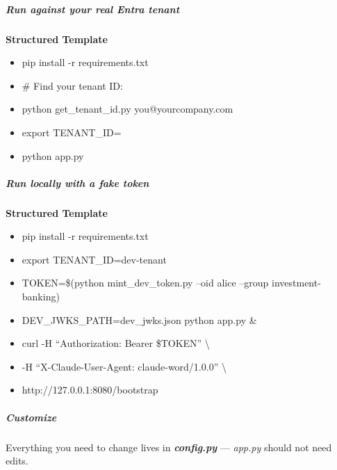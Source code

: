 \documentclass[11pt]{article}
\begin{document}
\subparagraph{Run against your real Entra tenant}\mbox{}\par

\textbf{Structured Template}
\begin{itemize}[leftmargin=*,itemsep=2pt,topsep=2pt]
\item {} pip install -r requirements.txt
\item {} \# Find your tenant ID:
\item {} python get\_\allowbreak{}tenant\_\allowbreak{}id.py you@yourcompany.com
\item {} export TENANT\_\allowbreak{}ID=
\item {} python app.py
\end{itemize}

\subparagraph{Run locally with a fake token}\mbox{}\par

\textbf{Structured Template}
\begin{itemize}[leftmargin=*,itemsep=2pt,topsep=2pt]
\item {} pip install -r requirements.txt
\item {} export TENANT\_\allowbreak{}ID=dev-tenant
\item {} TOKEN=\$(python mint\_\allowbreak{}dev\_\allowbreak{}token.py --oid alice --group investment-banking)
\item {} DEV\_\allowbreak{}JWKS\_\allowbreak{}PATH=dev\_\allowbreak{}jwks.json python app.py \&
\item {} curl -H ``Authorization: Bearer \$TOKEN'' \textbackslash{}
\item {} -H ``X-Claude-User-Agent: claude-word/1.0.0'' \textbackslash{}
\item {} http://127.0.0.1:8080/bootstrap
\end{itemize}

\subparagraph{Customize}\mbox{}\par

Everything you need to change lives in \textbf{\emph{config.py}} — \emph{app.py} should not need edits.
\end{document}
